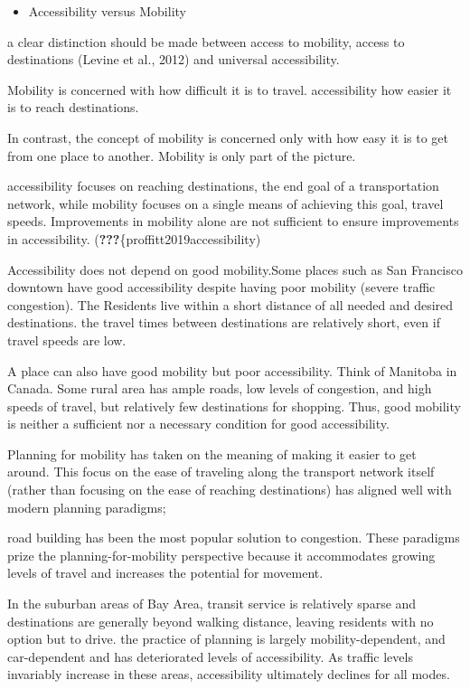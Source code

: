 \documentclass[12pt,]{article}
\providecommand{\tightlist}{%
  \setlength{\itemsep}{0pt}\setlength{\parskip}{0pt}}
\begin{document}
\begin{itemize}
\tightlist
\item
  Accessibility versus Mobility
\end{itemize}

a clear distinction should be made between access to mobility, access to
destinations (Levine et al., 2012) and universal accessibility.

Mobility is concerned with how difficult it is to travel. accessibility
how easier it is to reach destinations.

In contrast, the concept of mobility is concerned only with how easy it
is to get from one place to another. Mobility is only part of the
picture.

accessibility focuses on reaching destinations, the end goal of a
transportation network, while mobility focuses on a single means of
achieving this goal, travel speeds. Improvements in mobility alone are
not sufficient to ensure improvements in accessibility.
({\textbf{???}}\{proffitt2019accessibility)

Accessibility does not depend on good mobility.Some places such as San
Francisco downtown have good accessibility despite having poor mobility
(severe traffic congestion). The Residents live within a short distance
of all needed and desired destinations. the travel times between
destinations are relatively short, even if travel speeds are low.

A place can also have good mobility but poor accessibility. Think of
Manitoba in Canada. Some rural area has ample roads, low levels of
congestion, and high speeds of travel, but relatively few destinations
for shopping. Thus, good mobility is neither a sufficient nor a
necessary condition for good accessibility.

Planning for mobility has taken on the meaning of making it easier to
get around. This focus on the ease of traveling along the transport
network itself (rather than focusing on the ease of reaching
destinations) has aligned well with modern planning paradigms;

road building has been the most popular solution to congestion. These
paradigms prize the planning-for-mobility perspective because it
accommodates growing levels of travel and increases the potential for
movement.

In the suburban areas of Bay Area, transit service is relatively sparse
and destinations are generally beyond walking distance, leaving
residents with no option but to drive. the practice of planning is
largely mobility-dependent, and car-dependent and has deteriorated
levels of accessibility. As traffic levels invariably increase in these
areas, accessibility ultimately declines for all modes.
\end{document}

